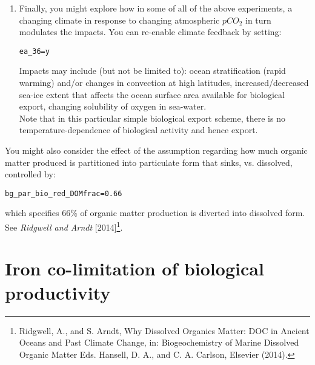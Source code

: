 \documentclass[11pt,fleqn]{book} %
\begin{document}
\begin{enumerate}[noitemsep]
\vspace{1mm}
\item Finally, you might explore how in some of all of the above experiments,  a changing climate in response to changing atmospheric \(pCO_{2}\) in turn modulates the impacts. You can re-enable climate feedback by setting:
\vspace{-2pt}\begin{verbatim}
ea_36=y
\end{verbatim}\vspace{-2pt} 
Impacts may include (but not be limited to): ocean stratification (rapid warming) and/or changes in convection at high latitudes, increased/decreased sea-ice extent that affects the ocean surface area available for biological export, changing solubility of oxygen in sea-water.
\\Note that in this particular simple biological export scheme, there is no temperature-dependence of biological activity and hence export.

\end{enumerate}
\vspace{1mm}

You might also consider the effect of the assumption regarding how much organic matter produced is partitioned into particulate form that sinks, vs. dissolved, controlled by:
\vspace{-2pt}\begin{verbatim}
bg_par_bio_red_DOMfrac=0.66
\end{verbatim}\vspace{-2pt}
which specifies 66\% of organic matter production is diverted into dissolved form. See \textit{Ridgwell and Arndt} [2014]\footnote{Ridgwell, A., and S. Arndt, Why Dissolved Organics Matter: DOC in Ancient Oceans and Past Climate Change, in: Biogeochemistry of Marine Dissolved Organic Matter Eds. Hansell, D. A., and C. A. Carlson, Elsevier (2014).}.


\newpage


\section{Iron co-limitation of biological productivity}




\end{document}
